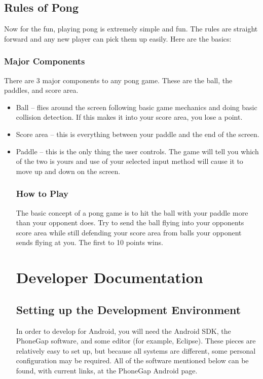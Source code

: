 \documentclass[12pt]{article}
\begin{document}
\subsection{Rules of Pong}
Now for the fun, playing pong is extremely simple and fun. The rules are straight forward and any new player can pick them up easily. Here are the basics:
\subsubsection {Major Components}
There are 3 major components to any pong game. These are the ball, the paddles, and score area. 
\begin{itemize}
\item Ball – flies around the screen following basic game mechanics and doing basic collision detection. If this makes it into your score area, you lose a point.
\item Score area – this is everything between your paddle and the end of the screen. 
\item Paddle – this is the only thing the user controls. The game will tell you which of the two is yours and use of your selected input method will cause it to move up and down on the screen. 
\subsubsection{How to Play}
The basic concept of a pong game is to hit the ball with your paddle more than your opponent does. Try to send the ball flying into your opponents score area while still defending your score area from balls your opponent sends flying at you. The first to 10 points wins.




\section{Developer Documentation}

\label{sec:developerdocumentation}

\subsection{Setting up the Development Environment}
In order to develop for Android, you will need the Android SDK, the PhoneGap software, and some editor (for example, Eclipse).  These pieces are relatively easy to set up, but because all systems are different, some personal configuration may be required.  All of the software mentioned below can be found, with current links, at the PhoneGap Android page\cite{PhoneGap-Android}.  


\end{itemize}
\end{document}

